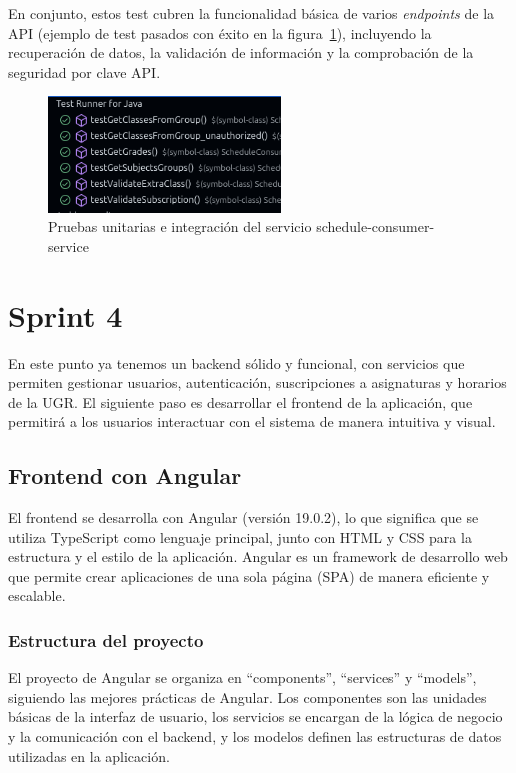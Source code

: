 En conjunto, estos test cubren la funcionalidad básica de varios \textit{endpoints} de la API (ejemplo de test pasados con éxito en la figura~\ref{test}), incluyendo la recuperación de datos, la validación de información y la comprobación de la seguridad por clave API.

\begin{figure}[H]
    \centering
    \includegraphics[width=0.55\textwidth]{figures/07_test.png}
    \caption{Pruebas unitarias e integración del servicio schedule-consumer-service}
    \label{test}
\end{figure}

\section{Sprint 4}

En este punto ya tenemos un backend sólido y funcional, con servicios que permiten gestionar usuarios, autenticación, suscripciones a asignaturas y horarios de la UGR. El siguiente paso es desarrollar el frontend de la aplicación, que permitirá a los usuarios interactuar con el sistema de manera intuitiva y visual.
\subsection{Frontend con Angular}
El frontend se desarrolla con Angular (versión 19.0.2), lo que significa que se utiliza TypeScript como lenguaje principal, junto con HTML y CSS para la estructura y el estilo de la aplicación. Angular es un framework de desarrollo web que permite crear aplicaciones de una sola página (SPA) de manera eficiente y escalable.
\subsubsection{Estructura del proyecto}
El proyecto de Angular se organiza en ``components'', ``services'' y ``models'', siguiendo las mejores prácticas de Angular. Los componentes son las unidades básicas de la interfaz de usuario, los servicios se encargan de la lógica de negocio y la comunicación con el backend, y los modelos definen las estructuras de datos utilizadas en la aplicación.
